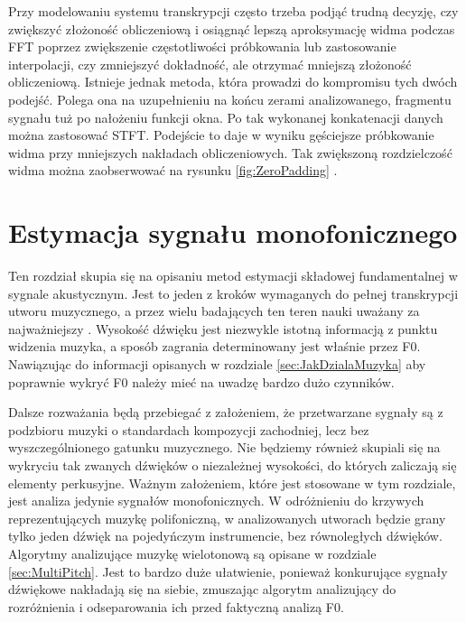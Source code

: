 \documentclass[12pt,a4paper,twoside]{mwart}
\begin{document}
Przy modelowaniu systemu transkrypcji często trzeba podjąć trudną decyzję, czy zwiększyć złożoność obliczeniową i osiągnąć lepszą aproksymację widma podczas FFT poprzez zwiększenie częstotliwości próbkowania lub zastosowanie interpolacji, czy zmniejszyć dokładność, ale otrzymać mniejszą złożoność obliczeniową. Istnieje jednak metoda, która prowadzi do kompromisu tych dwóch podejść. Polega ona na uzupełnieniu na końcu zerami analizowanego, fragmentu sygnału tuż po nałożeniu funkcji okna. Po tak wykonanej konkatenacji danych można zastosować STFT. Podejście to daje w wyniku gęściejsze próbkowanie widma przy mniejszych nakładach obliczeniowych. Tak zwiększoną rozdzielczość widma można zaobserwować na rysunku \ref{fig:ZeroPadding} \cite[221-224]{CyfrowePrzetwarzanieSygnalowOdTeoriiDoZastosowan}.

\clearpage

\section{Estymacja sygnału monofonicznego}\label{sec:f0}
Ten rozdział skupia się na opisaniu metod estymacji składowej fundamentalnej w sygnale akustycznym. Jest to jeden z kroków wymaganych do pełnej transkrypcji utworu muzycznego, a przez wielu badających ten teren nauki uważany za najważniejszy  \cite[2-4]{Transcription:Klapuri:ChallengesAndFuture}. Wysokość dźwięku jest niezwykle istotną informacją z punktu widzenia muzyka, a sposób zagrania determinowany jest właśnie przez F0. Nawiązując do informacji opisanych w rozdziale \ref{sec:JakDzialaMuzyka} aby poprawnie wykryć F0 należy mieć na uwadzę bardzo dużo czynników. 

Dalsze rozważania będą przebiegać z założeniem, że przetwarzane sygnały są z podzbioru muzyki o standardach kompozycji zachodniej, lecz bez wyszczególnionego gatunku muzycznego. Nie będziemy również skupiali się na wykryciu tak zwanych dźwięków o niezależnej wysokości, do których zaliczają się elementy perkusyjne. Ważnym założeniem, które jest stosowane w tym rozdziale, jest analiza jedynie sygnałów monofonicznych. W odróżnieniu do krzywych reprezentujących muzykę polifoniczną, w analizowanych utworach będzie grany tylko jeden dźwięk na pojedyńczym instrumencie, bez równoległych dźwięków. Algorytmy analizujące muzykę wielotonową są opisane w rozdziale \ref{sec:MultiPitch}. Jest to bardzo duże ułatwienie, ponieważ konkurujące sygnały dźwiękowe nakładają się na siebie, zmuszając algorytm analizujący do rozróżnienia i odseparowania ich przed faktyczną analizą F0. 
\end{document}
